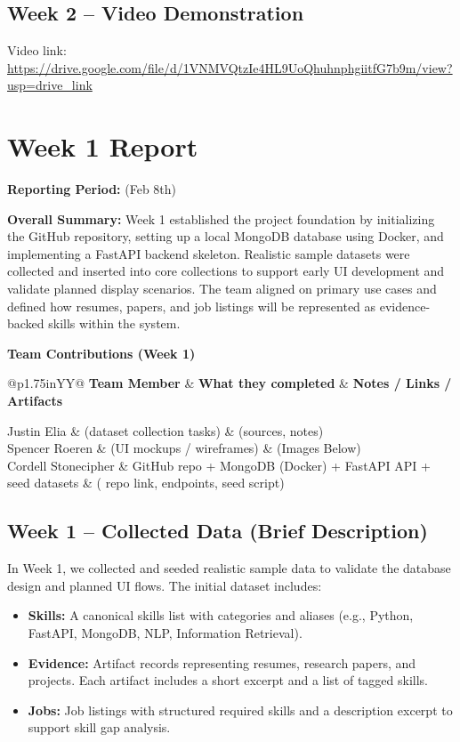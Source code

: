 \documentclass[11pt]{article}
\makeatletter
\newcommand{\WeekReport}[4]{
  \clearpage
  \section*{Week #1 Report}
  \addcontentsline{toc}{section}{Week #1 Report}
  \vspace{-0.25em}
  \noindent\textbf{Reporting Period:} #2

  \vspace{0.5em}
  \noindent\textbf{Overall Summary:} #3

  \vspace{0.75em}
  \noindent\textbf{Team Contributions (Week #1)}
  \vspace{0.25em}

  \begin{table}[H]
    \renewcommand{\arraystretch}{1.2}
    \begin{tabularx}{\linewidth}{@{}p{1.75in}YY@{}}
      \toprule
      \textbf{Team Member} & \textbf{What they completed} & \textbf{Notes / Links / Artifacts} \\
      \midrule
      #4
      \bottomrule
    \end{tabularx}
  \end{table}
}
\makeatother
\begin{document}
\subsection*{Week 2 -- Video Demonstration}
\noindent
Video link: \url{https://drive.google.com/file/d/1VNMVQtzIe4HL9UoQhuhnphgiitfG7b9m/view?usp=drive_link}


\WeekReport{1}{(Feb 8th)}{
Week 1 established the project foundation by initializing the GitHub repository, setting up a local MongoDB database using Docker, and implementing a FastAPI backend skeleton. Realistic sample datasets were collected and inserted into core collections to support early UI development and validate planned display scenarios. The team aligned on primary use cases and defined how resumes, papers, and job listings will be represented as evidence-backed skills within the system.
}{
Justin Elia & (dataset collection tasks) & (sources, notes) \\
Spencer Roeren & (UI mockups / wireframes) & (Images Below) \\
Cordell Stonecipher & GitHub repo + MongoDB (Docker) + FastAPI API + seed datasets & ( repo link, endpoints, seed script) \\
}


\subsection*{Week 1 -- Collected Data (Brief Description)}
\noindent
In Week 1, we collected and seeded realistic sample data to validate the database design and planned UI flows. The initial dataset includes:
\begin{itemize}
  \item \textbf{Skills:} A canonical skills list with categories and aliases (e.g., Python, FastAPI, MongoDB, NLP, Information Retrieval).
  \item \textbf{Evidence:} Artifact records representing resumes, research papers, and projects. Each artifact includes a short excerpt and a list of tagged skills.
  \item \textbf{Jobs:} Job listings with structured required skills and a description excerpt to support skill gap analysis.
\end{itemize}
\end{document}
